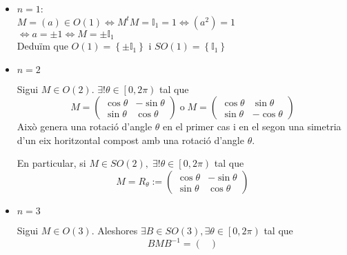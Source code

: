 \documentclass[a4paper,12pt]{article}
\begin{document}
	\begin{itemize}
	    \item $n = 1$:\\
	    $M = (a) \in O(1) \iff M^tM = \mathbb{I}_1 = 1 \iff (a^2) = 1$\\$\iff a = \pm 1 \iff M = \pm \mathbb{I}_1$\\
	    Deduïm que $O(1) = \left\{\pm \mathbb{I}_1\right\}$ i $SO(1) = \left\{\mathbb{I}_1\right\}$
	    \item $n = 2$
	    \begin{proposicio}
	        Sigui $M \in O(2)$. $\exists! \theta \in \left[0, 2\pi\right)$ tal que\\
	        \begin{displaymath}
	            M =
				\begin{pmatrix}
	                \cos{\theta} & -\sin{\theta}\\
	                \sin{\theta} & \cos{\theta}
				\end{pmatrix}
				\;\text{o}\;
				M =
				\begin{pmatrix}
	                \cos{\theta} & \sin{\theta}\\
	                \sin{\theta} & -\cos{\theta}
	            \end{pmatrix}
	        \end{displaymath}
	        Això genera una rotació d'angle $\theta$ en el primer cas i en el segon una simetria d'un
	        eix horitzontal compost amb una rotació d'angle $\theta$.
	    \end{proposicio}
	    \begin{obs}
	        En particular, si $M \in SO(2),\; \exists! \theta \in \left[0, 2\pi\right)$ tal que
	        \begin{displaymath}
	            M = R_\theta :=
				\begin{pmatrix}
	                \cos{\theta} & -\sin{\theta}\\
	                \sin{\theta} & \cos{\theta}
	            \end{pmatrix}
	        \end{displaymath}
	    \end{obs}
	    \item $n = 3$
	    \begin{proposicio}
	        Sigui $M \in O(3)$. Aleshores $\exists B \in SO(3), \exists \theta \in \left[0, 2\pi\right)$
	        tal que
			\begin{displaymath}
	            BMB^{-1} =
				\begin{pmatrix}

\end{pmatrix}
\end{displaymath}
\end{proposicio}
\end{itemize}
\end{document}
